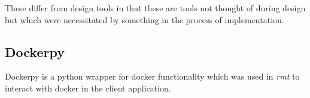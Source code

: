 These differ from design tools in that these are tools not thought of during design but which were necessitated by something in the process of implementation.

\subsection{Dockerpy}
\label{impl:dockerpy}
Dockerpy \citep{dockerpy} is a python wrapper for docker functionality which was used in \emph{rmt} to interact with docker in the client application. 
